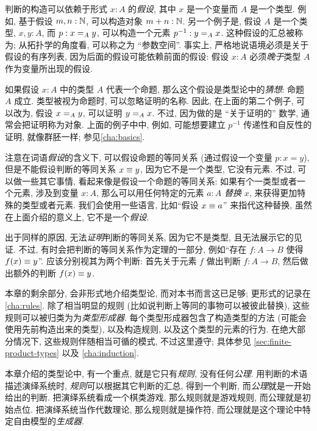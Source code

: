 %
判断的构造可以依赖于形式 $x:A$ 的\emph{假设}, 其中 $x$ 是一个变量而 $A$ 是一个类型.
例如, 基于假设 $m,n : \nat$, 可以构造对象 $m + n : \nat$.
另一个例子是, 假设 $A$ 是一个类型, $x,y : A$, 而  $p : \id[A]{x}{y}$, 可以构造一个元素 $p^{-1} : \id[A]{y}{x}$.
这种假设的汇总被称为;
从拓扑学的角度看, 可以称之为 ``参数空间''.
事实上, 严格地说语境必须是关于假设的有序列表, 因为后面的假设可能依赖前面的假设: 假设 $x:A$ 必须\emph{晚于}类型 $A$ 作为变量所出现的假设.

如果假设 $x:A$ 中的类型 $A$ 代表一个命题, 那么这个假设是类型论中的\emph{猜想}:
%
命题 $A$ 成立.
类型被视为命题时, 可以忽略证明的名称.
因此, 在上面的第二个例子, 可以改为, 假设 $\id[A]{x}{y}$, 可以证明 $\id[A]{y}{x}$.
不过, 因为做的是 ``关于证明的'' 数学,
%
通常会把证明称为对象.
上面的例子中中, 例如, 可能想要建立 $p^{-1}$ 传递性和自反性的证明, 就像群胚一样;
参见\cref{cha:basics}.

注意在词语\emph{假设}的含义下, 可以假设命题的等同关系 (通过假设一个变量 $p:x=y$), 但是不能假设判断的等同关系 $x\jdeq y$, 因为它不是一个类型, 它没有元素.
不过, 可以做一些其它事情, 看起来像是假设一个命题的等同关系: 如果有个一类型或者一个元素, 涉及到变量 $x:A$, 那么可以用任何特定的元素 $a:A$ \emph{替换} $x$, 来获得更加特殊的类型或者元素.
我们会使用一些语言, 比如``假设 $x\jdeq a$'' 来指代这种替换, 虽然在上面介绍的意义上, 它不是一个\emph{假设}.
%
%

出于同样的原因, 无法\emph{证明}判断的等同关系, 因为它不是类型, 且无法展示它的见证.
不过, 有时会把判断的等同关系作为定理的一部分, 例如``存在 $f:A\to B$ 使得 $f(x)\jdeq y$''.
应该分别视其为两个判断: 首先关于元素 $f$ 做出判断  $f:A\to B$, 然后做出额外的判断 $f(x)\jdeq y$.

本章的剩余部分, 会非形式地介绍类型论, 而对本书而言这已足够;
更形式的记录在\cref{cha:rules}.
除了相当明显的规则 (比如说判断上等同的事物可以被彼此替换), 这些规则可以被归类为为\emph{类型形成器}.
每个类型形成器包含了构造类型的方法 (可能会使用先前构造出来的类型), 以及构造规则, 以及这个类型的元素的行为.
在绝大部分情况下, 这些规则伴随相当可循的模式, 不过这里遵守;
具体参见 \cref{sec:finite-product-types} 以及 \cref{cha:induction}.
%

%
%
本章介绍的类型论中, 有一个重点, 就是它只有\emph{规则}, 没有任何\emph{公理}.
用判断的术语描述演绎系统时, \emph{规则}可以根据其它判断的汇总, 得到一个判断, 而\emph{公理}就是一开始给出的判断.
把演绎系统看成一个棋类游戏, 那么规则就是游戏规则, 而公理就是初始点位.
把演绎系统当作代数理论, 那么规则就是操作符, 而公理就是这个理论中特定自由模型的\emph{生成器}.


